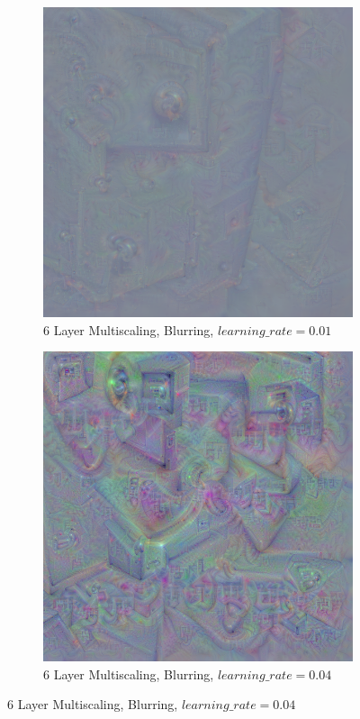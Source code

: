 \begin{figure}
    \captionsetup{justification=centering}

    \begin{subfigure}[t]{0.31\textwidth}
        \captionsetup{justification=centering}
        \centering
        \includegraphics[width=.7\linewidth]{figuras/feat_vis/experiments/classes/cl771/random_image_ci771_lr1e-2_pl6.png}
        \caption{6 Layer Multiscaling, Blurring, \(learning\_rate = 0.01\)}
    \end{subfigure}
    \hfill
    \begin{subfigure}[t]{0.31\textwidth}
        \captionsetup{justification=centering}
        \centering
        \includegraphics[width=.7\linewidth]{figuras/feat_vis/experiments/classes/cl771/random_image_ci771_lr4e-2_pl6.png}
        \caption{6 Layer Multiscaling, Blurring, \(learning\_rate = 0.04\)}

\end{subfigure}
\end{figure}
